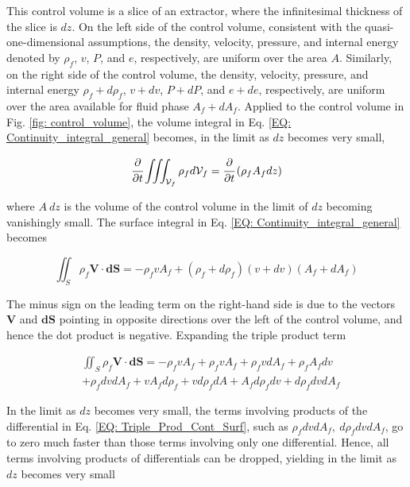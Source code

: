 \documentclass[../Article_Model_Parameters.tex]{subfiles}
\begin{document}
	This control volume is a slice of an extractor, where the infinitesimal thickness of the slice is $dz$. On the left side of the control volume, consistent with the quasi-one-dimensional assumptions, the density, velocity, pressure, and internal energy denoted by $\rho_f$, $v$, $P$, and $e$, respectively, are uniform over the area $A$. Similarly, on the right side of the control volume, the density, velocity, pressure, and internal energy $\rho_f+d\rho_f$, $v+dv$, $P+dP$, and $e+de$, respectively, are uniform over the area available for fluid phase $A_f+dA_f$. Applied to the control volume in Fig. \ref{fig: control_volume}, the volume integral in Eq. \ref{EQ: Continuity_integral_general} becomes, in the limit as $dz$ becomes very small,
	
	{\footnotesize
		\begin{equation}
			\cfrac{\partial}{\partial t} \iiint_{\mathcal{V}_f} \rho_f d\mathcal{V}_f = \cfrac{\partial}{\partial t}\left( \rho_f A_f dz \right)
			\label{EQ: Cont_Simpl_Vol}
		\end{equation}
	}

	where $A~dz$ is the volume of the control volume in the limit of $dz$ becoming vanishingly small. The surface integral in Eq. \ref{EQ: Continuity_integral_general} becomes
	
	{\footnotesize
		\begin{equation}
			\iint_S \rho_f \textbf{V} \cdot \textbf{dS} = -\rho_f v A_f + (\rho_f+d\rho_f)(v+dv)(A_f+dA_f)
		\end{equation}
	}

	The minus sign on the leading term on the right-hand side is due to the vectors $\textbf{V}$ and $\textbf{dS}$ pointing in opposite directions over the left of the control volume, and hence the dot product is negative. Expanding the triple product term 
	 
	{\footnotesize
		\begin{align}
			&\iint_S \rho_f \textbf{V} \cdot \textbf{dS} = -\rho_f v A_f + \rho_f v A_f + \rho_f v dA_f + \rho_f A_f dv \nonumber \\ 
			&+ \rho_f dv dA_f + v A_f d\rho_f + v d\rho_f dA + A_f d\rho_f dv + d\rho_f dv dA_f
			\label{EQ: Triple_Prod_Cont_Surf}
		\end{align}
	}
	
	In the limit as $dz$ becomes very small, the terms involving products of the differential in Eq. \ref{EQ: Triple_Prod_Cont_Surf}, such as $\rho_f dv dA_f,~d\rho_f dv dA_f$, go to zero much faster than those terms involving only one differential. Hence, all terms involving products of differentials can be dropped, yielding in the limit as $dz$ becomes very small
	
\end{document}
